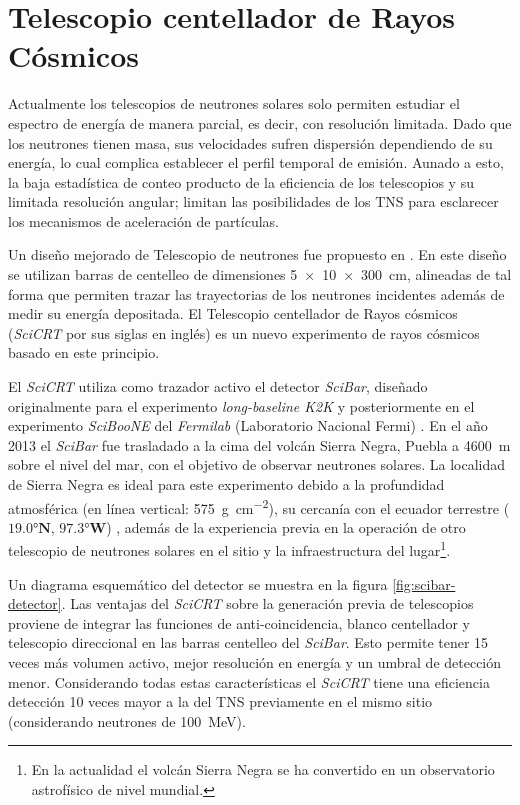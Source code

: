 
\chapter{Telescopio centellador de Rayos Cósmicos}
\label{chap:dos}

Actualmente los telescopios de neutrones solares solo permiten estudiar el espectro de energía de manera parcial, es decir, con resolución limitada. Dado que los neutrones tienen masa, sus velocidades sufren dispersión dependiendo de su energía, lo cual complica establecer el perfil temporal de emisión. Aunado a esto, la baja estadística de conteo producto de la eficiencia de los telescopios y su limitada resolución angular; limitan las posibilidades de los TNS para esclarecer los mecanismos de aceleración de partículas.

Un diseño mejorado de Telescopio de neutrones fue propuesto en \cite{sako03}. En este diseño se utilizan barras de centelleo de dimensiones \SI[product-units=power]{5x10x300}{\cm}, alineadas de tal forma que permiten trazar las trayectorias de los neutrones incidentes además de medir su energía depositada. El Telescopio centellador de Rayos cósmicos (\emph{SciCRT} por sus siglas en inglés) es un nuevo experimento de rayos cósmicos basado en este principio.

El \emph{SciCRT} utiliza como trazador activo el detector \emph{SciBar}, diseñado originalmente para el experimento \emph{long-baseline K2K} \cite{knitta04} y posteriormente en el experimento \emph{SciBooNE} del \emph{Fermilab} (Laboratorio Nacional Fermi) \cite{hiraide06}. En el año \num{2013} el \emph{SciBar} fue trasladado a la cima del volcán Sierra Negra, Puebla a \SI{4600}{\metre} sobre el nivel del mar, con el objetivo de observar neutrones solares. La localidad de Sierra Negra es ideal para este experimento debido a la profundidad atmosférica (en línea vertical: \SI{575}{\gram\per\square\centi\metre}), su cercanía con el ecuador terrestre ($\ang{19.0}\mathbf{N}$, $\ang{97.3}\mathbf{W}$) , además de la experiencia previa en la operación de otro telescopio de neutrones solares en el sitio y la infraestructura del lugar\footnote{En la actualidad el volcán Sierra Negra se ha convertido en un observatorio astrofísico de nivel mundial.}.

Un diagrama esquemático del detector se muestra en la figura \ref{fig:scibar-detector}. Las ventajas del \emph{SciCRT} sobre la generación previa de telescopios proviene de integrar las funciones de anti-coincidencia, blanco centellador y telescopio direccional en las barras centelleo del \emph{SciBar}. Esto permite tener \num{15} veces más volumen activo, mejor resolución en energía y un umbral de detección menor. Considerando todas estas características el \emph{SciCRT} tiene una eficiencia detección \num{10} veces mayor a la del TNS previamente en el mismo sitio \cite{ynagai14} (considerando neutrones de \SI{100}{\mega\electronvolt}).

